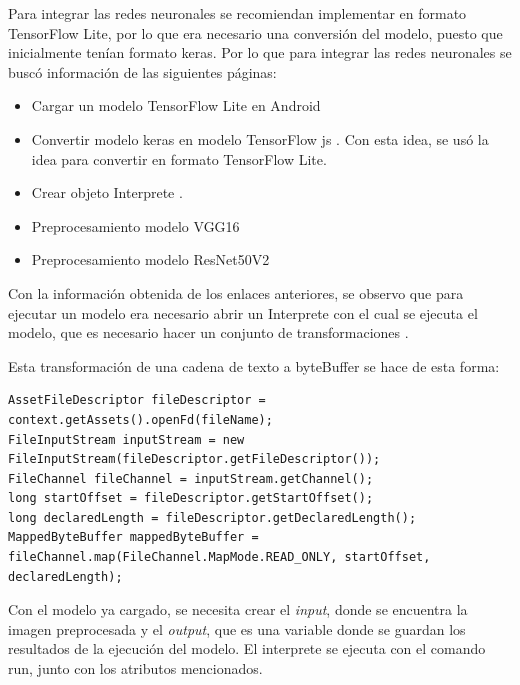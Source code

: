  Para integrar las redes neuronales se recomiendan implementar en formato TensorFlow Lite, por lo que era necesario una conversión del modelo, puesto que inicialmente tenían formato keras. Por lo que para integrar las redes neuronales se buscó información de las siguientes páginas:
\begin{itemize}
    \item Cargar un modelo TensorFlow Lite en Android \cite{tensorflow-lite-android-quickstart}
    \item Convertir modelo keras en modelo TensorFlow js \cite{tensorflow-js-import-keras}. Con esta idea, se usó la idea para convertir en formato TensorFlow Lite.
    \item Crear objeto Interprete \cite{tensorflow-lite-guide}.
    \item Preprocesamiento modelo VGG16~\cite{tensorflowVGG16}
    \item Preprocesamiento modelo ResNet50V2~\cite{tensorflowResNet50V2}
\end{itemize}

Con la información obtenida de los enlaces anteriores, se observo que para ejecutar un modelo era necesario abrir un Interprete con el cual se ejecuta el modelo, que es necesario hacer un conjunto de transformaciones .

Esta transformación de una cadena de texto a byteBuffer se hace de esta forma:
\begin{lstlisting}
AssetFileDescriptor fileDescriptor = context.getAssets().openFd(fileName);
FileInputStream inputStream = new FileInputStream(fileDescriptor.getFileDescriptor());
FileChannel fileChannel = inputStream.getChannel();
long startOffset = fileDescriptor.getStartOffset();
long declaredLength = fileDescriptor.getDeclaredLength();
MappedByteBuffer mappedByteBuffer = fileChannel.map(FileChannel.MapMode.READ_ONLY, startOffset, declaredLength);
\end{lstlisting}

Con el modelo ya cargado, se necesita crear el \textit{input}, donde se encuentra la imagen preprocesada y el \textit{output}, que es una variable donde se guardan los resultados de la ejecución del modelo. El interprete se ejecuta con el comando run, junto con los atributos mencionados.

